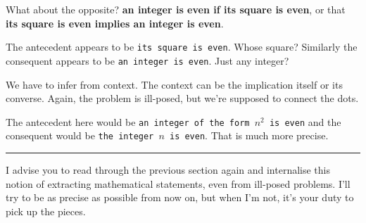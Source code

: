 What about the opposite? \textbf{an integer is even if its square is even}, or that \textbf{its square is even implies an integer is even}.

The antecedent appears to be \texttt{its square is even}. Whose square? Similarly the consequent appears to be \texttt{an integer is even}. Just any integer?

We have to infer from context. The context can be the implication itself or its converse. Again, the problem is ill-posed, but we're supposed to connect the dots.

The antecedent here would be \texttt{an integer of the form $n^2$ is even} and the consequent would be \texttt{the integer $n$ is even}. That is much more precise.\\

\hrule

I advise you to read through the previous section again and internalise this notion of extracting mathematical statements, even from ill-posed problems. I'll try to be as precise as possible from now on, but when I'm not, it's your duty to pick up the pieces.
